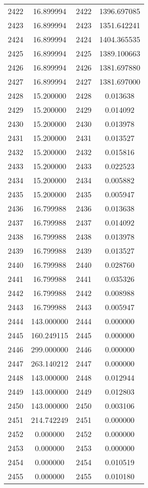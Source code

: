 \documentclass[12pt]{article}
\begin{document}
\begin{longtable}{@{}cccc@{}}
2422 & 16.899994 & 2422 & 1396.697085 \\
2423 & 16.899994 & 2423 & 1351.642241 \\
2424 & 16.899994 & 2424 & 1404.365535 \\
2425 & 16.899994 & 2425 & 1389.100663 \\
2426 & 16.899994 & 2426 & 1381.697880 \\
2427 & 16.899994 & 2427 & 1381.697000 \\
2428 & 15.200000 & 2428 & 0.013638 \\
2429 & 15.200000 & 2429 & 0.014092 \\
2430 & 15.200000 & 2430 & 0.013978 \\
2431 & 15.200000 & 2431 & 0.013527 \\
2432 & 15.200000 & 2432 & 0.015816 \\
2433 & 15.200000 & 2433 & 0.022523 \\
2434 & 15.200000 & 2434 & 0.005882 \\
2435 & 15.200000 & 2435 & 0.005947 \\
2436 & 16.799988 & 2436 & 0.013638 \\
2437 & 16.799988 & 2437 & 0.014092 \\
2438 & 16.799988 & 2438 & 0.013978 \\
2439 & 16.799988 & 2439 & 0.013527 \\
2440 & 16.799988 & 2440 & 0.028760 \\
2441 & 16.799988 & 2441 & 0.035326 \\
2442 & 16.799988 & 2442 & 0.008988 \\
2443 & 16.799988 & 2443 & 0.005947 \\
2444 & 143.000000 & 2444 & 0.000000 \\
2445 & 160.249115 & 2445 & 0.000000 \\
2446 & 299.000000 & 2446 & 0.000000 \\
2447 & 263.140212 & 2447 & 0.000000 \\
2448 & 143.000000 & 2448 & 0.012944 \\
2449 & 143.000000 & 2449 & 0.012803 \\
2450 & 143.000000 & 2450 & 0.003106 \\
2451 & 214.742249 & 2451 & 0.000000 \\
2452 & 0.000000 & 2452 & 0.000000 \\
2453 & 0.000000 & 2453 & 0.000000 \\
2454 & 0.000000 & 2454 & 0.010519 \\
2455 & 0.000000 & 2455 & 0.010180 \\

\end{longtable}
\end{document}

